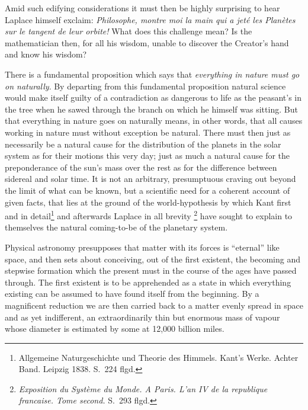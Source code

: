 \documentclass[12pt,a4paper]{book}
\renewcommand{\thefootnote}{*)}
\begin{document}
Amid such edifying considerations it must then be highly surprising to hear Laplace himself exclaim:
\textit{Philosophe, montre moi la main qui a jeté les Planètes sur le tangent de leur orbite!} What does
this challenge mean? Is the mathematician then, for all his wisdom, unable to discover the Creator's hand
and know his wisdom?

There is a fundamental proposition which says that \emph{everything in nature must go on naturally}. By
departing from this fundamental proposition natural science would make itself guilty of a contradiction as
dangerous to life as the peasant's in the tree when he sawed through the branch on which he himself was
sitting. But that
everything in nature goes on naturally means, in other words, that all causes working in nature must
without exception be natural. There must then just as necessarily be a natural cause for the distribution
of the planets in the solar system as for their motions this very day; just as much a natural cause for
the preponderance of the sun's mass over the rest as for the difference between sidereal and solar time.
It is not an arbitrary, presumptuous craving out beyond the limit of what can be known, but a scientific
need for a coherent account of given facts, that lies at the ground of the world-hypothesis by which Kant
first and in detail\footnote{%
Allgemeine Naturgeschichte und Theorie des Himmels. Kant's Werke. Achter Band. Leipzig 1838. S.\ 224 flgd.}
and afterwards Laplace in all brevity%
\renewcommand{\thefootnote}{**)}%
\footnote{%
\textit{Exposition du Système du Monde. A Paris. L'an IV de la republique francaise. Tome second.} S.\ 293
flgd.}%
\renewcommand{\thefootnote}{*)}
have sought to explain to themselves the natural coming-to-be of the planetary system.

Physical astronomy presupposes that matter with its forces is ``eternal'' like space, and then sets about
conceiving, out of the first existent, the becoming and stepwise formation which the present must in the
course of the ages have passed through. The first existent is to be apprehended as a state in which
everything existing can be assumed to have found itself from the beginning. By a magnificent reduction we
are then carried back to a matter evenly spread in space and as yet indifferent, an extraordinarily thin
but enormous mass of vapour whose diameter is estimated by some at 12,000 billion miles.
\end{document}
